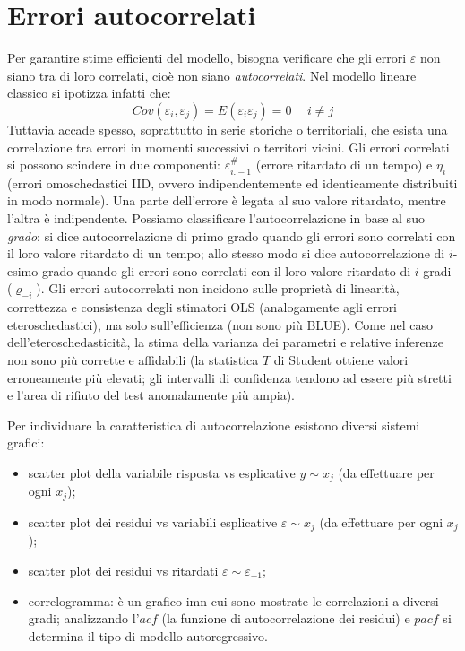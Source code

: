 \documentclass[a4page, 11pt]{article} %
\begin{document}
\section{Errori autocorrelati}
Per garantire stime efficienti del modello, bisogna verificare che gli errori $\varepsilon$ non siano tra di loro correlati, cioè non siano \textit{autocorrelati}.
Nel modello lineare classico si ipotizza infatti che:
\begin{equation*}
  Cov(\varepsilon_i, \varepsilon_j) = E(\varepsilon_i \varepsilon_j) = 0 \hspace{15pt} i \neq j
\end{equation*}
Tuttavia accade spesso, soprattutto in serie storiche o territoriali, che esista una correlazione tra errori in momenti successivi o territori vicini.
Gli errori correlati si possono scindere in due componenti:
$\varepsilon_{i.-1}^\#$ (errore ritardato di un tempo) e $\eta_i$ (errori omoschedastici IID, ovvero indipendentemente ed identicamente distribuiti in modo normale).
Una parte dell'errore è legata al suo valore ritardato, mentre l'altra è indipendente.
Possiamo classificare l’autocorrelazione in base al suo \textit{grado}: si dice autocorrelazione di primo grado quando gli errori sono correlati con il loro valore ritardato di un tempo; allo stesso modo si dice autocorrelazione di $i$-esimo grado quando gli errori sono correlati con il loro valore ritardato di $i$ gradi ($\varrho_{-i}$).
Gli errori autocorrelati non incidono sulle proprietà di linearità, correttezza e consistenza degli stimatori OLS (analogamente agli errori eteroschedastici), ma solo sull’efficienza (non sono più BLUE).
Come nel caso dell’eteroschedasticità, la stima della varianza dei parametri e relative inferenze non sono più corrette e affidabili (la statistica $T$ di Student ottiene valori erroneamente più elevati; gli intervalli di confidenza tendono ad essere più stretti e l'area di rifiuto del test anomalamente più ampia).

Per individuare la caratteristica di autocorrelazione esistono diversi sistemi grafici:
\begin{itemize}[noitemsep]
  \item scatter plot della variabile risposta vs esplicative $y \sim x_j$ (da effettuare per ogni $x_j$);
  \item scatter plot dei residui vs variabili esplicative $\varepsilon \sim x_j$ (da effettuare per ogni $x_j$);
  \item scatter plot dei residui vs ritardati $\varepsilon \sim \varepsilon_{-1}$;
  \item correlogramma: è un grafico imn cui sono mostrate le correlazioni a diversi gradi; analizzando l'$acf$ (la funzione di autocorrelazione dei residui) e $pacf$ si determina il tipo di modello autoregressivo.
\end{itemize}
\end{document}
